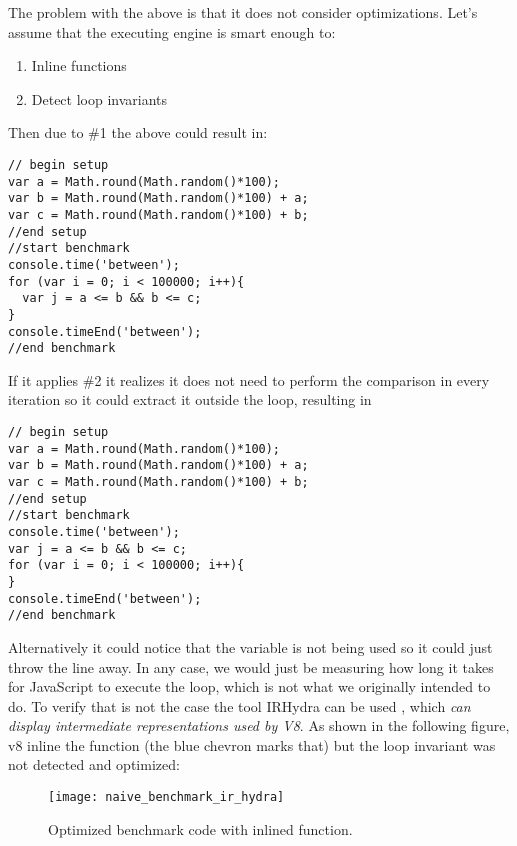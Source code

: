 The problem with the above is that it does not consider optimizations. Let's assume that the executing engine is smart enough to:
\begin{enumerate}
  \item Inline functions
  \item Detect loop invariants
\end{enumerate}

Then due to \#1 the above could result in:
\begin{lstlisting}[caption=Naive benchmark after inlining]
// begin setup
var a = Math.round(Math.random()*100);
var b = Math.round(Math.random()*100) + a;
var c = Math.round(Math.random()*100) + b;
//end setup
//start benchmark
console.time('between');
for (var i = 0; i < 100000; i++){
  var j = a <= b && b <= c;
}
console.timeEnd('between');
//end benchmark
\end{lstlisting}

If it applies \#2 it realizes it does not need to perform the comparison in every iteration so it could extract it outside the loop, resulting in
\begin{lstlisting}[caption=Naive benchmark after evaluating loop invariants]
// begin setup
var a = Math.round(Math.random()*100);
var b = Math.round(Math.random()*100) + a;
var c = Math.round(Math.random()*100) + b;
//end setup
//start benchmark
console.time('between');
var j = a <= b && b <= c;
for (var i = 0; i < 100000; i++){
}
console.timeEnd('between');
//end benchmark
\end{lstlisting}

Alternatively it could notice that the variable  is not being used so it could just throw the line away. In any case, we would just be measuring how long it takes for JavaScript to execute the loop, which is not what we originally intended to do. To verify that is not the case the tool IRHydra\cite{ir-hydra} can be used , which \textit{can display intermediate representations used by V8}. As shown in the following figure, v8 inline the function (the blue chevron marks that) but the loop invariant was not detected and optimized:
\begin{figure}[h!]
  \centering
  \texttt{[image: naive\_benchmark\_ir\_hydra]}
  \caption{Optimized benchmark code with inlined function.}
\end{figure}



\pagebreak